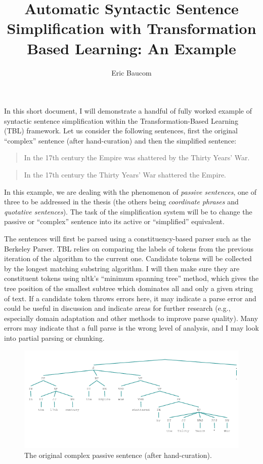\documentclass{article}
\begin{document}
\author{Eric Baucom}
\title{Automatic Syntactic Sentence Simplification with Transformation Based Learning: An Example}
\maketitle

In this short document, I will demonstrate a handful of fully worked example of syntactic sentence simplification within the Transformation-Based Learning (TBL) framework. Let us consider the following sentences, first the original ``complex'' sentence (after hand-curation) and then the simplified sentence:

\begin{quote}
In the 17th century the Empire was shattered by the Thirty Years' War.
\end{quote}

\begin{quote}
In the 17th century the Thirty Years' War shattered the Empire.
\end{quote}

In this example, we are dealing with the phenomenon of \textit{passive sentences}, one of three to be addressed in the thesis (the others being \textit{coordinate phrases} and \textit{quotative sentences}). The task of the simplification system will be to change the passive or ``complex'' sentence into its active or ``simplified'' equivalent.

The sentences will first be parsed using a constituency-based parser such as the Berkeley Parser. TBL relies on comparing the labels of tokens from the previous iteration of the algorithm to the current one. Candidate tokens will be collected by the longest matching substring algorithm. I will then make sure they are
constituent tokens using nltk's ``minimum spanning tree'' method, which gives the
tree position of the smallest subtree which dominates all and only a given
string of text. If a candidate token throws errors here, it may
indicate a parse error and could be useful in discussion and indicate
areas for further research (e.g., especially domain adaptation and other methods to improve parse quality). Many errors may indicate that a full
parse is the wrong level of analysis, and I may look into partial parsing or chunking.

\begin{figure}
\begin{center}
\includegraphics[scale=.65]{tree}
\caption{The original complex passive sentence (after hand-curation).}
\end{center}
\end{figure}
\end{document}
